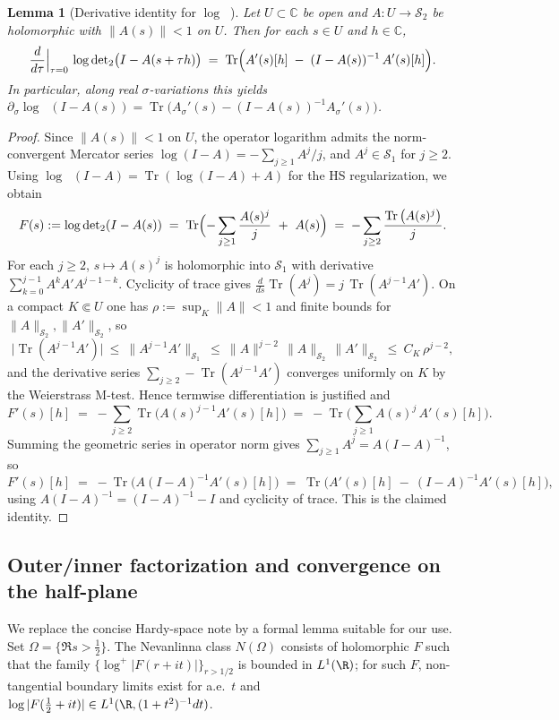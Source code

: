 \documentclass[11pt]{article}
\newtheorem{lemma}[theorem]{Lemma}
\theoremstyle{remark}
\newcommand{\C}{\mathbb{C}}
\newcommand{\HS}{\mathcal{S}_2}
\DeclareMathOperator{\Tr}{Tr}
\DeclareMathOperator{\dettwo}{det_2}
\begin{document}
\begin{lemma}[Derivative identity for $\log\dettwo$]
Let $U\subset\C$ be open and $A:U\to\HS$ be holomorphic with $\|A(s)\|<1$ on $U$. Then for each $s\in U$ and $h\in\C$,
\[
 \frac{d}{d\tau}\Big|_{\tau=0}\,\log\dettwo\bigl(I-A(s+\tau h)\bigr)\;=\;\Tr\Bigl(A'(s)[h]\; -\; (I-A(s))^{-1}\,A'(s)[h]\Bigr).
\]
In particular, along real $\sigma$-variations this yields $\partial_\sigma\log\dettwo(I-A(s))=\Tr\bigl(A_\sigma'(s) - (I-A(s))^{-1}A_\sigma'(s)\bigr)$.
\end{lemma}
\begin{proof}
Since $\|A(s)\|<1$ on $U$, the operator logarithm admits the norm-convergent Mercator series $\log(I-A)=-\sum_{j\ge 1} A^j/j$, and $A^j\in\mathcal S_1$ for $j\ge 2$. Using $\log\dettwo(I-A)=\Tr(\log(I-A)+A)$ for the HS regularization, we obtain
\[
 F(s):=\log\dettwo(I-A(s))\;=\;\Tr\Bigl(-\sum_{j\ge 1}\frac{A(s)^j}{j}\ +\ A(s)\Bigr)\;=\;-\sum_{j\ge 2}\frac{\Tr\big(A(s)^j\big)}{j}.
\]
For each $j\ge 2$, $s\mapsto A(s)^j$ is holomorphic into $\mathcal S_1$ with derivative $\sum_{k=0}^{j-1} A^k A' A^{j-1-k}$. Cyclicity of trace gives $\frac{d}{ds}\Tr(A^j)= j\,\Tr(A^{j-1}A')$. On a compact $K\Subset U$ one has $\rho:=\sup_K\|A\|<1$ and finite bounds for $\|A\|_{\HS},\|A'\|_{\HS}$, so
\[
 \big|\Tr(A^{j-1}A')\big|\ \le\ \|A^{j-1}A'\|_{\mathcal S_1}\ \le\ \|A\|^{j-2}\,\|A\|_{\HS}\,\|A'\|_{\HS}\ \le\ C_K\,\rho^{j-2},
\]
and the derivative series $\sum_{j\ge 2} -\Tr(A^{j-1}A')$ converges uniformly on $K$ by the Weierstrass M-test. Hence termwise differentiation is justified and
\[
 F'(s)[h]\;=\;-\sum_{j\ge 2}\Tr\big(A(s)^{j-1} A'(s)[h]\big)\;=\;-\Tr\Big(\sum_{j\ge 1} A(s)^{j}\, A'(s)[h]\Big).
\]
Summing the geometric series in operator norm gives $\sum_{j\ge 1} A^{j}=A(I-A)^{-1}$, so
\[
 F'(s)[h]\;=\;-\Tr\big( A(I-A)^{-1} A'(s)[h]\big)\;=\;\Tr\Big( A'(s)[h]\ -\ (I-A)^{-1}A'(s)[h]\Big),
\]
using $A(I-A)^{-1}=(I-A)^{-1}-I$ and cyclicity of trace. This is the claimed identity.
\end{proof}

\subsection{Outer/inner factorization and convergence on the half-plane}\label{app:outer}
We replace the concise Hardy-space note by a formal lemma suitable for our use. Set $\Omega=\{\Re s>\tfrac12\}$. The Nevanlinna class $N(\Omega)$ consists of holomorphic $F$ such that the family $\{\log^+|F(r+it)|\}_{r>1/2}$ is bounded in $L^1(\R)$; for such $F$, non-tangential boundary limits exist for a.e.~$t$ and $\log|F(\tfrac12+it)|\in L^1(\R,(1+t^2)^{-1}dt)$.
\end{document}
